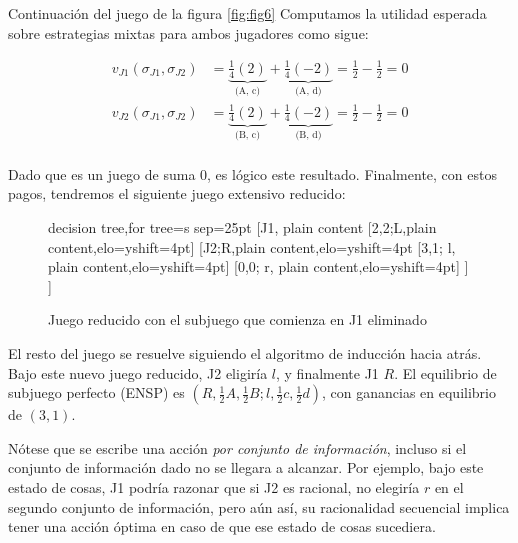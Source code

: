 \documentclass[12pt]{scrartcl}
\begin{document}
\begin{exbox}{Continuación del juego de la figura \ref{fig:fig6}}
	Computamos la utilidad esperada sobre estrategias mixtas para ambos jugadores como sigue:
	\vspace{-0.6cm}
	    
	\begin{align*}
		v_{J1}(\sigma_{J1}, \sigma_{J2}) & = \underbrace{\frac{1}{4}(2)}_\text{(A, c)} + \underbrace{\frac{1}{4}(-2)}_\text{(A, d)} = \frac{1}{2} - \frac{1}{2} = 0  \\
		v_{J2}(\sigma_{J1}, \sigma_{J2}) & = \underbrace{ \frac{1}{4}(2)}_\text{(B, c)} + \underbrace{\frac{1}{4}(-2)}_\text{(B, d)} = \frac{1}{2} - \frac{1}{2} = 0 \\
	\end{align*}
	\vspace{-0.5cm}
	    
	Dado que es un juego de suma 0, es lógico este resultado. Finalmente, con estos pagos, tendremos el siguiente juego extensivo reducido:
	    
	\begin{figure}[H]
		\centering
		\footnotesize{
			\begin{forest} decision tree,for tree={s sep=25pt}
				[J1, plain content
					[{2,2};L,plain content,elo={yshift=4pt}]
					[J2;R,plain content,elo={yshift=4pt}
						[{3,1}; l, plain content,elo={yshift=4pt}]
						[{0,0}; r, plain content,elo={yshift=4pt}]
					]
				]
			\end{forest}}
		\caption{Juego reducido con el subjuego que comienza en J1 eliminado}
		\label{fig:fig7}
	\end{figure}
	
	El resto del juego se resuelve siguiendo el algoritmo de inducción hacia atrás. Bajo este nuevo juego reducido, J2 eligiría $l$, y finalmente J1 $R$. El equilibrio de subjuego perfecto (ENSP) es $(R, \frac{1}{2}A, \frac{1}{2}B; l, \frac{1}{2}c, \frac{1}{2}d)$, con ganancias en equilibrio de $(3,1)$.
	
	Nótese que se escribe una acción \textit{por conjunto de información}, incluso si el conjunto de información dado no se llegara a alcanzar. Por ejemplo, bajo este estado de cosas, J1 podría razonar que si J2 es racional, no elegiría $r$ en el segundo conjunto de información, pero aún así, su racionalidad secuencial implica tener una acción óptima en caso de que ese estado de cosas sucediera.
	
\end{exbox}
\end{document}
